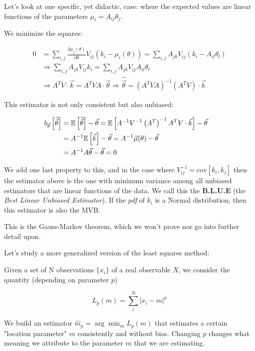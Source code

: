 \begin{example}
	Let's look at one specific, yet didactic, case: where the expected values are linear functions of the parameters $\mu_i = A_{ij}\theta_j$.
	
	We minimize the squares:
	
	\begin{align*}
		0 &= \sum_{i,j} \frac{\partial \mu_j(\theta)}{\partial\theta}V_{ij}\left(k_i - \mu_i(\theta)\right) = \sum_{i,j} A_{jk} V_{ij}\left(k_i - A_{il}\theta_l\right) \\
		&\Rightarrow \sum_{i,j} A_{jk} V_{ij}k_i = \sum_{i,j} A_{jk} V_{ij}A_{il}\theta_l \\
		&\Rightarrow A^T V\cdot \vec{k} = A^T VA\cdot\vec{\theta}\Rightarrow \hat{\vec{\theta}} = \left(A^T VA\right)^{-1}\left(A^TV\right)\cdot\vec{k}
	\end{align*}
	
	This estimator is not only consistent but also unbiased:
	
	\begin{align*}
		b_{\vec\theta}\left[\hat{\vec{\theta}}\right] &= \mathbb{E}\left[\hat{\vec{\theta}}\right] - \vec\theta = \mathbb{E}\left[A^{-1}V^{-1}\left(A^T\right)^{-1}A^TV\cdot \vec{k}\right] - \vec\theta \\
		&= A^{-1}\mathbb{E}\left[\vec{k}\right] - \vec\theta =  A^{-1}\vec{\mu}(\theta) - \vec\theta &\\
		&=A^{-1}A\vec{\theta} - \vec\theta = 0 
	\end{align*}
	
	We add one last property to this, and in the case where $V_{ij}^{-1} = \text{cov}\left[k_i,k_j\right]$ then the estimator above is the one with minimum variance among all unbiased estimators that are linear functions of the data. We call this the \textbf{B.L.U.E} (the \emph{Best Linear Unbiased Estimator}). If the \emph{pdf} of $k_i$ is a Normal distribution, then this estimator is also the MVB. 
	
	This is the Gauss-Markov theorem, which we won't prove nor go into further detail upon. 
\end{example}

Let's study a more generalized version of the least squares method:
\begin{definition}
Given a set of N observations $\{x_i\}$ of a real observable $X$, we consider the quantity (depending on parameter $p$)
	
	\[
	L_p(m) = \sum_i^N \left|x_i - m\right|^p
	\]
	
We build an estimator $\hat{m}_p=\arg\min_m L_p(m)$ that estimates a certain "location parameter" $m$ consistently and without bias. Changing $p$ changes what meaning we attribute to the parameter $m$ that we are estimating.
\end{definition}

